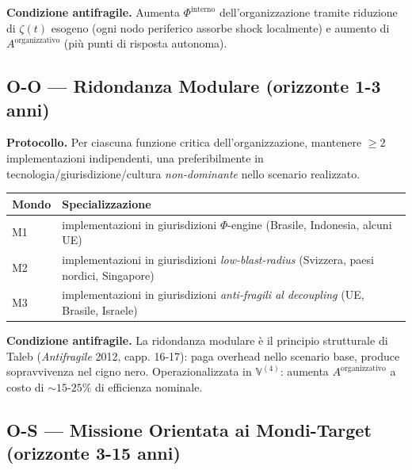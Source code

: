 \Proved{} \textbf{Condizione antifragile.} Aumenta
\(\Phi^{\text{interno}}\) dell'organizzazione tramite riduzione di
\(\zeta(t)\) esogeno (ogni nodo periferico assorbe shock localmente) e
aumento di \(A^{\text{organizzativo}}\) (più punti di risposta
autonoma).

\subsection{O-O --- Ridondanza Modulare (orizzonte 1-3
anni)}\label{o-o-ridondanza-modulare-orizzonte-1-3-anni}

\Hypoth{} \textbf{Protocollo.} Per ciascuna funzione critica
dell'organizzazione, mantenere \(\geq 2\) implementazioni indipendenti,
una preferibilmente in tecnologia/giurisdizione/cultura
\emph{non-dominante} nello scenario realizzato.

{\def\LTcaptype{none} %
{\small\begin{longtable}[]{@{}
  >{\raggedright\arraybackslash}p{}
  >{\raggedright\arraybackslash}p{}@{}}
\toprule\noalign{}
\begin{minipage}[b]{\linewidth}\raggedright
Mondo
\end{minipage} & \begin{minipage}[b]{\linewidth}\raggedright
Specializzazione
\end{minipage} \\
\midrule\noalign{}
\endhead
\bottomrule\noalign{}
\endlastfoot
M1 & implementazioni in giurisdizioni \(\Phi\)-engine (Brasile,
Indonesia, alcuni UE) \\
M2 & implementazioni in giurisdizioni \emph{low-blast-radius} (Svizzera,
paesi nordici, Singapore) \\
M3 & implementazioni in giurisdizioni \emph{anti-fragili al decoupling}
(UE, Brasile, Israele) \\
\end{longtable}}
}

\Proved{} \textbf{Condizione antifragile.} La ridondanza modulare è il
principio strutturale di Taleb (\emph{Antifragile} 2012, capp. 16-17):
paga overhead nello scenario base, produce sopravvivenza nel cigno nero.
Operazionalizzata in \(\mathbb{V}^{(4)}\): aumenta
\(A^{\text{organizzativo}}\) a costo di \(\sim 15\)-\(25\%\) di
efficienza nominale.

\subsection{O-S --- Missione Orientata ai Mondi-Target (orizzonte 3-15
anni)}\label{o-s-missione-orientata-ai-mondi-target-orizzonte-3-15-anni}

